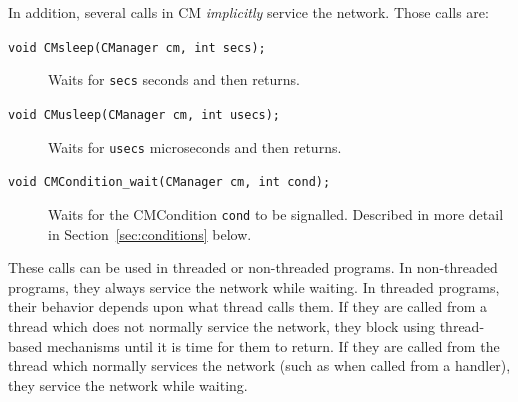 \documentclass[11pt]{article}
\begin{document}
In addition, several calls in CM {\it implicitly} service the network.
Those calls are:
\begin{description}
\item[{\tt void CMsleep(CManager cm, int secs);}]  Waits for {\tt secs}
seconds and then returns.
\item[{\tt void CMusleep(CManager cm, int usecs);}]  Waits for {\tt usecs}
microseconds and then returns.
\item[{\tt void CMCondition\_wait(CManager cm, int cond);}]  Waits for the
CMCondition {\tt cond} to be signalled.  Described in more detail in
Section~\ref{sec:conditions} below.
\end{description}
These calls can be used in threaded or non-threaded programs.  In
non-threaded programs, they always service the network while waiting.  In
threaded programs, their behavior depends upon what thread calls them.  If
they are called from a thread which does not normally service the network,
they block using thread-based mechanisms until it is time for them to
return.  If they are called from the thread which normally services the
network (such as when called from a handler), they service the network while
waiting.  
\end{document}
